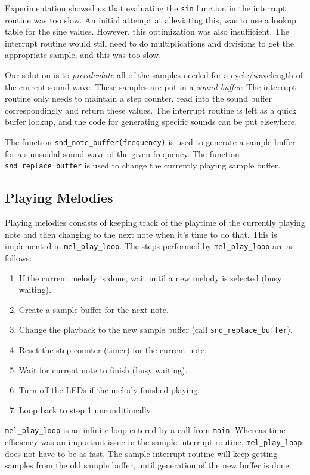 Experimentation showed us that evaluating the \texttt{sin} function in
the interrupt routine was too slow. An initial attempt at alleviating
this, was to use a lookup table for the sine values. However, this
optimization was also insufficient. The interrupt routine would still
need to do multiplications and divisions to get the appropriate sample,
and this was too slow.

Our solution is to \emph{precalculate} all of the samples needed for a
cycle/wavelength of the current sound wave. These samples are put in a
\emph{sound buffer}. The interrupt routine only needs to maintain a step
counter, read into the sound buffer correspondingly and return these
values. The interrupt routine is left as a quick buffer lookup, and the
code for generating specific sounds can be put elsewhere.

The function \texttt{snd\_note\_buffer(frequency)} is used to generate
a sample buffer for a sinusoidal sound wave of the given frequency. The
function \texttt{snd\_replace\_buffer} is used to change the currently
playing sample buffer.

\subsection{Playing Melodies}

Playing melodies consists of keeping track of the playtime of the
currently playing note and then changing to the next note when it's time
to do that. This is implemented in \texttt{mel\_play\_loop}. The steps
performed by \texttt{mel\_play\_loop} are as follows:

\begin{enumerate}
    \item If the current melody is done, wait until a new melody is
    selected (busy waiting).
    \item Create a sample buffer for the next note.
    \item Change the playback to the new sample buffer (call
    \texttt{snd\_replace\_buffer}).
    \item Reset the step counter (timer) for the current note.
    \item Wait for current note to finish (busy waiting).
    \item Turn off the LEDs if the melody finished playing.
    \item Loop back to step 1 unconditionally.
\end{enumerate}

\texttt{mel\_play\_loop} is an infinite loop entered by a call from
\texttt{main}. Whereas time efficiency was an important issue in the
sample interrupt routine, \texttt{mel\_play\_loop} does not have to be
as fast. The sample interrupt routine will keep getting samples from the
old sample buffer, until generation of the new buffer is done.

